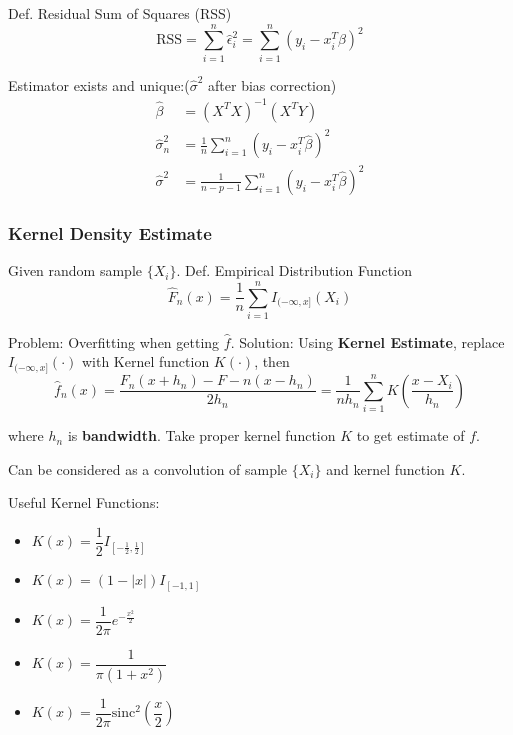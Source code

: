 \documentclass[11pt,a4paper]{ctexart}
\numberwithin{equation}{section}%
\begin{document}
    Def. Residual Sum of Squares (RSS)
    \[\mathrm{RSS}=\sum_{i=1}^n\hat{\epsilon}_i^2=\sum_{i=1}^n(y_i-x_i^T\beta)^2\]

    Estimator exists and unique:($\hat{\sigma}^2$ after bias correction)
    \begin{align*}
        \hat{\beta}&=(X^TX)^{-1}(X^TY)\\
        \hat{\sigma}_n^2&=\frac{1}{n}\sum_{i=1}^n(y_i-x^T_i\hat{\beta})^2\\
        \hat{\sigma}^2&=\frac{1}{n-p-1}\sum_{i=1}^n(y_i-x_i^T\hat{\beta})^2
    \end{align*}

\subsubsection{Kernel Density Estimate}\label{SubSectionKernelDensityEstimation}
    Given random sample $\{X_i\}$. Def. Empirical Distribution Function
    \begin{equation}\label{empiricaldisreibutionfunction}
        \hat{F}_n(x)=\frac{1}{n}\sum_{i=1}^nI_{(-\infty,x]}(X_i) 
    \end{equation}
        

    Problem: Overfitting when getting $\hat{f}$. Solution: Using \textbf{Kernel Estimate}, replace $I_{(-\infty,x]}(\cdot)$ with Kernel function $K(\cdot)$, then
    \[
        \hat{f}_n(x)=\dfrac{F_n(x+h_n)-F-n(x-h_n)}{2h_n}=\frac{1}{nh_n}\sum_{i=1}^nK(\frac{x-X_i}{h_n})
    \]

    where $h_n$ is \textbf{bandwidth}. Take proper kernel function $K$ to get estimate of $f$.

    Can be considered as a convolution of sample $\{X_i\}$ and kernel function $K$.

    Useful Kernel Functions:
    \begin{itemize}[itemsep= -6 pt,parsep= 0 pt]
        \item $K(x)=\dfrac{1}{2}I_{[-\frac{1}{2},\frac{1}{2}]}$\\
        \item $K(x)=(1-|x|)I_{[-1,1]}$\\
        \item $K(x)=\dfrac{1}{2\pi}e^{-\frac{x^2}{2}}$\\
        \item $K(x)=\dfrac{1}{\pi(1+x^2)}$\\
        \item $K(x)=\dfrac{1}{2\pi}\mathrm{sinc}^2(\dfrac{x}{2})$
    \end{itemize}
    
\end{document}
